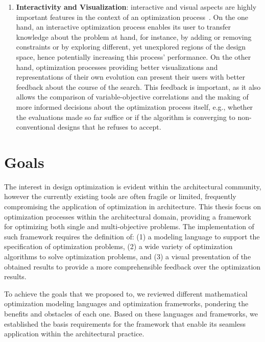 \begin{enumerate}
\item \textbf{Interactivity and Visualization}: interactive and visual aspects are highly important features in the context of an optimization process~\cite{Ashour2015CreativelyMOO}. On the one hand, an interactive optimization process enables its user to transfer knowledge about the problem at hand, for instance, by adding or removing constraints or by exploring different, yet unexplored regions of the design space, hence potentially increasing this process' performance. On the other hand, optimization processes providing better visualizations and representations of their own evolution can present their users with better feedback about the course of the search. This feedback is important, as it also allows the comparison of variable-objective correlations and the making of more informed decisions about the optimization process itself, e.g., whether the evaluations made so far suffice or if the algorithm is converging to non-conventional designs that he refuses to accept.
\end{enumerate}


\section{Goals}
The interest in design optimization is evident within the architectural community, however the currently existing tools are often fragile or limited, frequently compromising the application of optimization in architecture. This thesis focus on optimization processes within the architectural domain, providing a framework for optimizing both single and multi-objective problems. The implementation of such framework requires the definition of: (1) a modeling language to support the specification of optimization problems, (2) a wide variety of optimization algorithms to solve optimization problems, and (3) a visual presentation of the obtained results to provide a more comprehensible feedback over the optimization results.

To achieve the goals that we proposed to, we reviewed different mathematical optimization modeling languages and optimization frameworks, pondering the benefits and obstacles of each one. Based on these languages and frameworks, we established the basis requirements for the framework that enable its seamless application within the architectural practice. 

